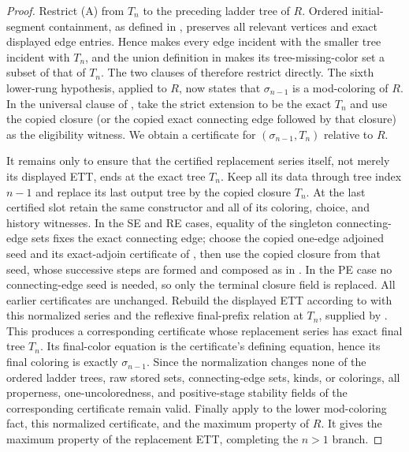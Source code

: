 \begin{proof}
Restrict (A) from \(T_n\) to the preceding ladder tree of \(R\).  Ordered
initial-segment containment, as defined in
, preserves all relevant vertices and
exact displayed edge entries.  Hence  makes every
edge incident with the smaller tree incident with \(T_n\), and the union
definition in  makes its tree-missing-color set
a subset of that of \(T_n\).  The two clauses of
 therefore restrict directly.  The sixth lower-rung
hypothesis, applied to \(R\), now states that
\(\sigma_{n-1}\) is a mod-coloring of \(R\).  In the universal clause of
, take the strict extension to be the exact \(T_n\)
and use the copied closure (or the copied exact connecting edge followed by
that closure) as the eligibility witness.  We obtain a
 certificate for
\((\sigma_{n-1},T_n)\) relative to \(R\).

It remains only to ensure that the certified replacement series itself,
not merely its displayed ETT, ends at the exact tree \(T_n\).  Keep all
its data through tree index \(n-1\) and replace its last output tree by the
copied closure \(T_n\).  At the last certified slot retain the same
constructor and all of its coloring, choice, and history witnesses.  In the
SE and RE cases, equality of the singleton connecting-edge sets fixes the
exact connecting edge; choose the copied one-edge adjoined seed and its
exact-adjoin certificate of , then use the
copied closure from that seed, whose successive steps are formed and
composed as in .  In the PE case no
connecting-edge seed is needed, so only the terminal closure field is
replaced.  All earlier certificates are unchanged.  Rebuild the displayed
ETT according to  with this normalized
series and the reflexive final-prefix relation at \(T_n\), supplied by
.  This produces a corresponding
certificate whose replacement series has exact final tree \(T_n\).  Its
final-color equation is the certificate's defining equation, hence its
final coloring is exactly \(\sigma_{n-1}\).  Since the normalization
changes none of the ordered ladder trees, raw stored sets, connecting-edge
sets, kinds, or colorings, all properness, one-uncoloredness, and
positive-stage stability fields of the corresponding certificate remain
valid.  Finally apply
 to the lower mod-coloring fact, this
normalized certificate, and the maximum property of \(R\).  It gives the
maximum property of the replacement ETT, completing the \(n>1\) branch.


\end{proof}
